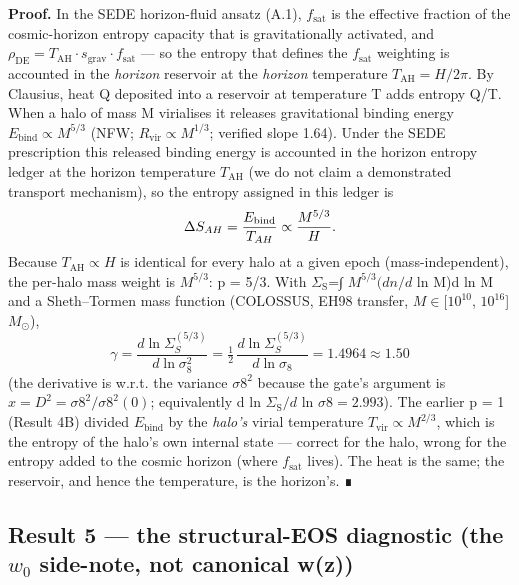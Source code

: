 \documentclass[preprint,12pt]{elsarticle}
\begin{document}
\textbf{Proof.} In the SEDE horizon-fluid ansatz (A.1),
\(f_{\mathrm{sat}}\) is the effective fraction of the cosmic-horizon
entropy capacity that is gravitationally activated, and
\(\rho _\mathrm{DE} = T_\mathrm{AH}\cdot s_{\mathrm{grav}}\cdot f_{\mathrm{sat}}\)
--- so the entropy that defines the \(f_{\mathrm{sat}}\) weighting is
accounted in the \emph{horizon} reservoir at the \emph{horizon}
temperature \(T_\mathrm{AH} = H/2\pi\). By Clausius, heat Q deposited
into a reservoir at temperature T adds entropy Q/T. When a halo of mass
M virialises it releases gravitational binding energy
\(E_{\mathrm{bind}} \propto  M^{5/3}\) (NFW;
\(R_{\mathrm{vir}} \propto  M^{1/3}\); verified slope 1.64). Under the
SEDE prescription this released binding energy is accounted in the
horizon entropy ledger at the horizon temperature \(T_\mathrm{AH}\) (we
do not claim a demonstrated transport mechanism), so the entropy
assigned in this ledger is
\begin{equation}\Delta S_{AH} = \frac{E_{\rm bind}}{T_{AH}} \propto \frac{M^{5/3}}{H}.\end{equation}
Because \(T_\mathrm{AH} \propto  H\) is identical for every halo at a
given epoch (mass-independent), the per-halo mass weight is \(M^{5/3}\):
p = 5/3. With \(\Sigma _{\mathrm{S}}\)=∫ \(M^{5/3}(dn/d\) ln M)d ln M
and a Sheth--Tormen mass function (COLOSSUS, EH98 transfer,
\(M \in  [10^{10}\), \(10^{16}\){]} \(M_\odot\)),
\begin{equation}\gamma = \frac{d\ln\Sigma_S^{(5/3)}}{d\ln\sigma_8^2} = \tfrac{1}{2}\,\frac{d\ln\Sigma_S^{(5/3)}}{d\ln\sigma_8} = 1.4964 \approx 1.50\end{equation}
(the derivative is w.r.t. the variance \(\sigma 8^{2}\) because the
gate's argument is \(x = D^{2} = \sigma 8^{2}/\sigma 8^{2}(0)\);
equivalently d ln \(\Sigma _{\mathrm{S}}/d\) ln \(\sigma 8 = 2.993\)).
The earlier p = 1 (Result 4B) divided \(E_{\mathrm{bind}}\) by the
\emph{halo's} virial temperature \(T_{\mathrm{vir}} \propto  M^{2/3}\),
which is the entropy of the halo's own internal state --- correct for
the halo, wrong for the entropy added to the cosmic horizon (where
\(f_{\mathrm{sat}}\) lives). The heat is the same; the reservoir, and
hence the temperature, is the horizon's. ∎

\subsection{\texorpdfstring{Result 5 --- the structural-EOS diagnostic
(the \(w_{0}\) side-note, not canonical
w(z))}{Result 5 --- the structural-EOS diagnostic (the w\_\{0\} side-note, not canonical w(z))}}\label{sec-A-4}
\end{document}
